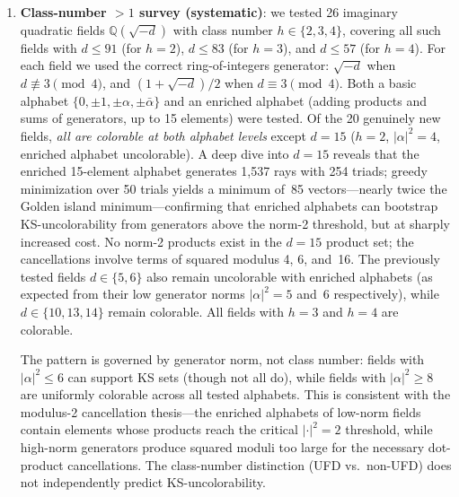 \documentclass[12pt,a4paper]{article}
\newcommand{\Q}{\mathbb{Q}}
\begin{document}
\begin{enumerate}
    \item \label{item:class-number-survey}\textbf{Class-number $> 1$ survey (systematic)}: we tested 26 imaginary quadratic fields $\Q(\sqrt{-d})$ with class number $h \in \{2, 3, 4\}$, covering all such fields with $d \leq 91$ (for $h = 2$), $d \leq 83$ (for $h = 3$), and $d \leq 57$ (for $h = 4$). For each field we used the correct ring-of-integers generator: $\sqrt{-d}$ when $d \not\equiv 3 \pmod{4}$, and $(1 + \sqrt{-d})/2$ when $d \equiv 3 \pmod{4}$. Both a basic alphabet $\{0, \pm 1, \pm\alpha, \pm\bar\alpha\}$ and an enriched alphabet (adding products and sums of generators, up to 15 elements) were tested. Of the 20 genuinely new fields, \emph{all are colorable at both alphabet levels} except $d = 15$ ($h = 2$, $|\alpha|^2 = 4$, enriched alphabet uncolorable).  A deep dive into $d = 15$ reveals that the enriched 15-element alphabet generates 1{,}537 rays with 254 triads; greedy minimization over 50 trials yields a minimum of~85 vectors---nearly twice the Golden island minimum---confirming that enriched alphabets can bootstrap KS-uncolorability from generators above the norm-2 threshold, but at sharply increased cost.  No norm-2 products exist in the $d = 15$ product set; the cancellations involve terms of squared modulus 4, 6, and~16. The previously tested fields $d \in \{5, 6\}$ also remain uncolorable with enriched alphabets (as expected from their low generator norms $|\alpha|^2 = 5$ and~6 respectively), while $d \in \{10, 13, 14\}$ remain colorable. All fields with $h = 3$ and $h = 4$ are colorable.

    The pattern is governed by generator norm, not class number: fields with $|\alpha|^2 \leq 6$ can support KS sets (though not all do), while fields with $|\alpha|^2 \geq 8$ are uniformly colorable across all tested alphabets. This is consistent with the modulus-2 cancellation thesis---the enriched alphabets of low-norm fields contain elements whose products reach the critical $|\cdot|^2 = 2$ threshold, while high-norm generators produce squared moduli too large for the necessary dot-product cancellations. The class-number distinction (UFD vs.\ non-UFD) does not independently predict KS-uncolorability.


\end{enumerate}
\end{document}
